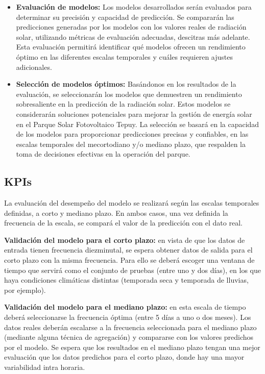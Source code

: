 \documentclass[a4paper]{article}
\begin{document}
\begin{itemize}
    \item \textbf{Evaluación de modelos:} Los modelos desarrollados serán evaluados para determinar su precisión y capacidad de predicción. Se compararán las predicciones generadas por los modelos con los valores reales de radiación solar, utilizando métricas de evaluación adecuadas, descitras más adelante. Esta evaluación permitirá identificar qué modelos ofrecen un rendimiento óptimo en las diferentes escalas temporales y cuáles requieren ajustes adicionales.
    \item \textbf{Selección de modelos óptimos:} Basándonos en los resultados de la evaluación, se seleccionarán los modelos que demuestren un rendimiento sobresaliente en la predicción de la radiación solar. Estos modelos se considerarán soluciones potenciales para mejorar la gestión de energía solar en el Parque Solar Fotovoltaico Tepuy. La selección se basará en la capacidad de los modelos para proporcionar predicciones precisas y confiables, en las escalas temporales del mecortodiano y/o mediano plazo, que respalden la toma de decisiones efectivas en la operación del parque.
\end{itemize}

\subsection{KPIs}

La evaluación del desempeño del modelo se realizará según las escalas temporales definidas, a corto y mediano plazo. En ambos casos, una vez definida la frecuencia de la escala, se compará el valor de la predicción con el dato real.

\textbf{Validación del modelo para el corto plazo:} en vista de que los datos de entrada tienen frecuencia diezminutal, se espera obtener datos de salida para el corto plazo con la misma frecuencia. Para ello se deberá escoger una ventana de tiempo que servirá como el conjunto de pruebas (entre uno y dos días), en los que haya condiciones climáticas distintas (temporada seca y temporada de lluvias, por ejemplo).

\textbf{Validación del modelo para el mediano plazo:} en esta escala de tiempo deberá seleccionarse la frecuencia óptima (entre 5 días a uno o dos meses). Los datos reales deberán escalarse a la frecuencia seleccionada para el mediano plazo (mediante alguna técnica de agregación) y compararse con los valores predichos por el modelo. Se espera que los resultados en el mediano plazo tengan una mejor evaluación que los datos predichos para el corto plazo, donde hay una mayor variabilidad intra horaria.
\end{document}

